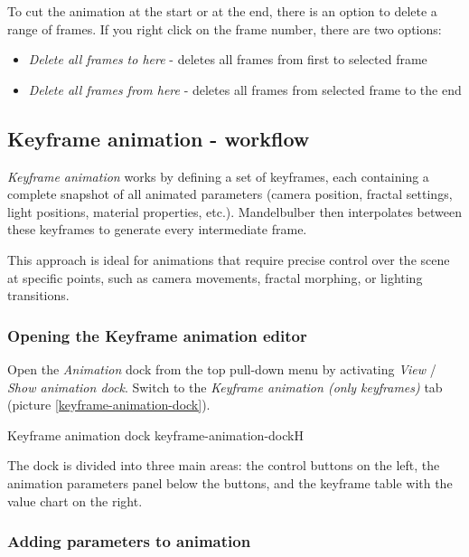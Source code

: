 	To cut the animation at the start or at the end, there is an option to delete a range of frames. If you right click on the frame number, there are two options:
	\begin{itemize}
		\item \emph{Delete all frames to here} - deletes all frames from first to selected frame
		\item \emph{Delete all frames from here} - deletes all frames from selected frame to the end
	\end{itemize}
	
	
	


\subsection{Keyframe animation - workflow}\label{keyframe-animation}

\emph{Keyframe animation} works by defining a set of keyframes, each containing a complete snapshot of all animated parameters (camera position, fractal settings, light positions, material properties, etc.). Mandelbulber then interpolates between these keyframes to generate every intermediate frame.

This approach is ideal for animations that require precise control over the scene at specific points, such as camera movements, fractal morphing, or lighting transitions.

\subsubsection{Opening the Keyframe animation editor}

Open the \emph{Animation} dock from the top pull-down menu by activating \emph{View} / \emph{Show animation dock}. Switch to the \emph{Keyframe animation (only keyframes)} tab (picture \ref{keyframe-animation-dock}).

{Keyframe animation dock}
{keyframe-animation-dock}{H}

The dock is divided into three main areas: the control buttons on the left, the animation parameters panel below the buttons, and the keyframe table with the value chart on the right.

\subsubsection{Adding parameters to animation}

